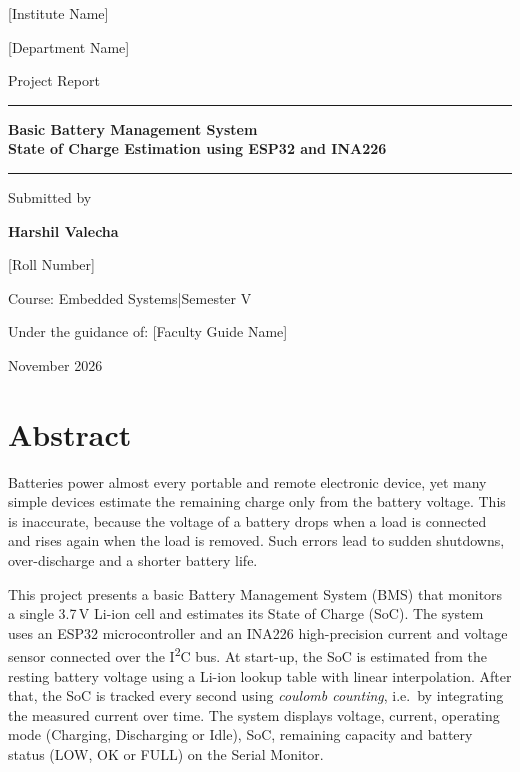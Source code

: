 \documentclass[12pt,a4paper,oneside]{report}
\newcommand{\studentname}{Harshil Valecha}
\newcommand{\rollno}{[Roll Number]}
\newcommand{\institute}{[Institute Name]}
\newcommand{\department}{[Department Name]}
\newcommand{\course}{Embedded Systems}
\newcommand{\semester}{Semester V}
\newcommand{\guide}{[Faculty Guide Name]}
\begin{document}
\begin{titlepage}
\centering
\vspace*{1cm}
{\Large \institute\par}
{\large \department\par}
\vspace{2cm}
{\large Project Report\par}
\vspace{0.4cm}
{\color{accent}\rule{\linewidth}{1.2pt}\par}
\vspace{0.4cm}
{\huge\bfseries Basic Battery Management System\\[6pt] \Large State of Charge Estimation using ESP32 and INA226\par}
\vspace{0.4cm}
{\color{accent}\rule{\linewidth}{1.2pt}\par}
\vspace{2cm}
{\large Submitted by\par}
\vspace{0.2cm}
{\Large\bfseries \studentname\par}
{\large \rollno\par}
\vspace{1.5cm}
{\large Course: \course \quad|\quad \semester\par}
\vspace{0.3cm}
{\large Under the guidance of: \guide\par}
\vfill
{\large November 2026\par}
\end{titlepage}

\chapter*{Abstract}

Batteries power almost every portable and remote electronic device, yet many simple devices estimate the remaining charge only from the battery voltage. This is inaccurate, because the voltage of a battery drops when a load is connected and rises again when the load is removed. Such errors lead to sudden shutdowns, over-discharge and a shorter battery life.

This project presents a basic Battery Management System (BMS) that monitors a single 3.7\,V Li-ion cell and estimates its State of Charge (SoC). The system uses an ESP32 microcontroller and an INA226 high-precision current and voltage sensor connected over the I\textsuperscript{2}C bus. At start-up, the SoC is estimated from the resting battery voltage using a Li-ion lookup table with linear interpolation. After that, the SoC is tracked every second using \emph{coulomb counting}, i.e.\ by integrating the measured current over time. The system displays voltage, current, operating mode (Charging, Discharging or Idle), SoC, remaining capacity and battery status (LOW, OK or FULL) on the Serial Monitor.
\end{document}

